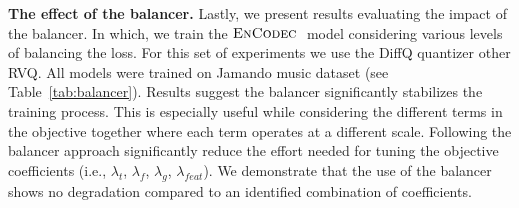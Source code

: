 {\noindent \bf The effect of the balancer.}
Lastly, we present results evaluating the impact of the balancer. In which, we train the $\textsc{EnCodec}~$ model considering various levels of balancing the loss. For this set of experiments we use the DiffQ quantizer other RVQ. All models were trained on Jamando music dataset (see Table~\ref{tab:balancer}). Results suggest the balancer significantly stabilizes the training process. This is especially useful while considering the different terms in the objective together where each term operates at a different scale. Following the balancer approach significantly reduce the effort needed for tuning the objective coefficients (i.e., $\lambda_t$, $\lambda_f$, $\lambda_g$, $\lambda_{feat}$). We demonstrate that the use of the balancer shows no degradation compared to an identified combination of coefficients. 


